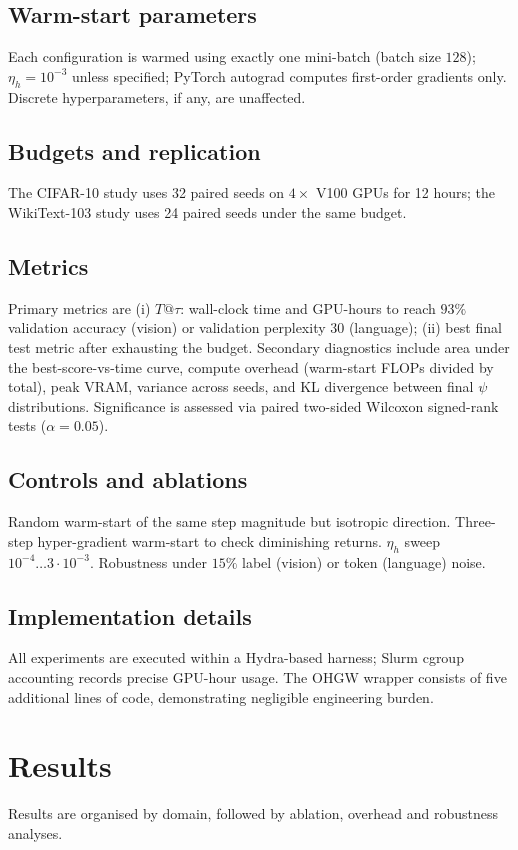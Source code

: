 \documentclass{article}
\begin{document}
\subsection{Warm-start parameters}
Each configuration is warmed using exactly one mini-batch (batch size $128$); $\eta_h = 10^{-3}$ unless specified; PyTorch autograd computes first-order gradients only. Discrete hyperparameters, if any, are unaffected.

\subsection{Budgets and replication}
The CIFAR-10 study uses 32 paired seeds on $4 \times$ V100 GPUs for 12 hours; the WikiText-103 study uses 24 paired seeds under the same budget.

\subsection{Metrics}
Primary metrics are (i) $T@\tau$: wall-clock time and GPU-hours to reach $93\%$ validation accuracy (vision) or validation perplexity $30$ (language); (ii) best final test metric after exhausting the budget. Secondary diagnostics include area under the best-score-vs-time curve, compute overhead (warm-start FLOPs divided by total), peak VRAM, variance across seeds, and KL divergence between final $\psi$ distributions. Significance is assessed via paired two-sided Wilcoxon signed-rank tests ($\alpha = 0.05$).

\subsection{Controls and ablations}
Random warm-start of the same step magnitude but isotropic direction. Three-step hyper-gradient warm-start to check diminishing returns. $\eta_h$ sweep $10^{-4} \ldots 3\cdot 10^{-3}$. Robustness under $15\%$ label (vision) or token (language) noise.

\subsection{Implementation details}
All experiments are executed within a Hydra-based harness; Slurm cgroup accounting records precise GPU-hour usage. The OHGW wrapper consists of five additional lines of code, demonstrating negligible engineering burden.

\section{Results}
Results are organised by domain, followed by ablation, overhead and robustness analyses.
\end{document}
